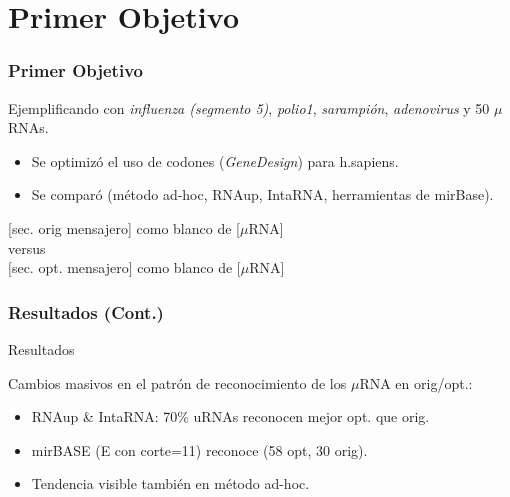 \documentclass[a4paper]{beamer}
\begin{document}
\section{Primer Objetivo}
\begin{frame}
    \frametitle{Primer Objetivo}
    Ejemplificando con \emph{influenza (segmento 5)}, \emph{polio1}, \emph{sarampión}, \emph{adenovirus} y 50 $\mu$RNAs.
	\begin{itemize}
        \item Se optimizó el uso de codones (\emph{GeneDesign}) para h.sapiens.
        \item Se comparó (método ad-hoc, RNAup, IntaRNA, herramientas de mirBase). 
    \end{itemize}   
    \vskip 1cm
    \hspace*{2cm} [sec. orig mensajero] como blanco de [$\mu$RNA] \\
    \hspace*{5cm} versus \\
    \hspace*{2cm} $[$sec. opt. mensajero$]$ como blanco de [$\mu$RNA] 
\end{frame}

\begin{frame}
    \frametitle{Resultados (Cont.)}
\begin{center}
    \begin{alertblock}{Resultados}
    \small{
    Cambios masivos en el patrón de reconocimiento de los $\mu$RNA en orig/opt.:
        \begin{itemize}
		    \item RNAup \& IntaRNA: 70\% uRNAs reconocen mejor opt. que orig.
		    \item mirBASE (E con corte=11) reconoce (58 opt, 30 orig). %
    		\item Tendencia visible también en método ad-hoc.
        \end{itemize}                
    }
    \end{alertblock}    
\end{center}
\end{frame}
\end{document}
